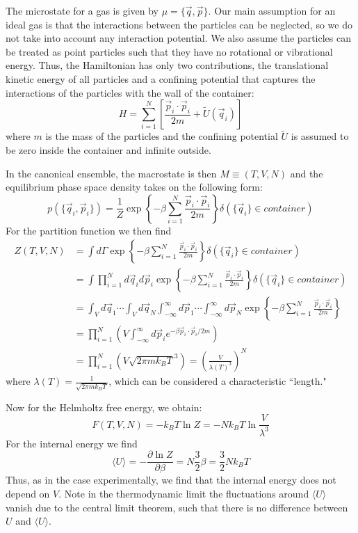 \documentclass[12pt, a4paper, oneside, openright, titlepage]{book}
\begin{document}
The microstate for a gas is given by $\mu = \{\vec{q},\vec{p}\}$. Our main assumption for an ideal gas is that the interactions between the particles can be neglected, so we do not take into account any interaction potential. We also assume the particles can be treated as point particles such that they have no rotational or vibrational energy. Thus, the Hamiltonian has only two contributions, the translational kinetic energy of all particles and a confining potential that captures the interactions of the particles with the wall of the container: \begin{equation*}
    H = \sum_{i=1}^N\left[\frac{\vec{p}_i\cdot\vec{p}_i}{2m} + \tilde{U}(\vec{q}_i)\right]
\end{equation*}
where $m$ is the mass of the particles and the confining potential $\tilde{U}$ is assumed to be zero inside the container and infinite outside.

In the canonical ensemble, the macrostate is then $M \equiv (T,V,N)$ and the equilibrium phase space density takes on the following form: \begin{equation*}
    p(\{\vec{q}_i,\vec{p}_i\}) = \frac{1}{Z}\exp\left\{-\beta\sum_{i=1}^N\frac{\vec{p}_i\cdot\vec{p}_i}{2m}\right\}\delta(\{\vec{q}_i\} \in container)
\end{equation*}
For the partition function we then find \begin{align*}
    Z(T,V,N) &= \int d\Gamma\exp\left\{-\beta\sum_{i=1}^N\frac{\vec{p}_i\cdot\vec{p}_i}{2m}\right\}\delta(\{\vec{q}_i\} \in container) \\
    &= \int \prod_{i=1}^Nd\vec{q}_id\vec{p}_i\exp\left\{-\beta\sum_{i=1}^N\frac{\vec{p}_i\cdot\vec{p}_i}{2m}\right\}\delta(\{\vec{q}_i\} \in container) \\
    &= \int_Vd\vec{q}_1\cdots \int_Vd\vec{q}_N\int_{-\infty}^{\infty}d\vec{p}_1\cdots \int_{-\infty}^{\infty}d\vec{p}_N\exp\left\{-\beta\sum_{i=1}^N\frac{\vec{p}_i\cdot\vec{p}_i}{2m}\right\} \\
    &=\prod_{i=1}^N\left(V\int_{-\infty}^{\infty}d\vec{p}_ie^{-\beta\vec{p}_i\cdot\vec{p}_i/2m}\right) \\
    &= \prod_{i=1}^N\left(V\sqrt{2\pi mk_BT}^3\right) = \left(\frac{V}{\lambda(T)^3}\right)^N
\end{align*}
where $\lambda(T) = \frac{1}{\sqrt{2\pi mk_BT}}$, which can be considered a characteristic ``length."

Now for the Helmholtz free energy, we obtain: \begin{equation*}
    F(T,V,N) = -k_BT\ln Z = -Nk_BT\ln\frac{V}{\lambda^3}
\end{equation*}
For the internal energy we find \begin{equation*}
    \langle U\rangle = -\frac{\partial\ln Z}{\partial \beta} = N\frac{3}{2}\beta = \frac{3}{2}Nk_BT
\end{equation*}
Thus, as in the case experimentally, we find that the internal energy does not depend on $V$. Note in the thermodynamic limit the fluctuations around $\langle U \rangle$ vanish due to the central limit theorem, such that there is no difference between $U$ and $\langle U \rangle$.
\end{document}
